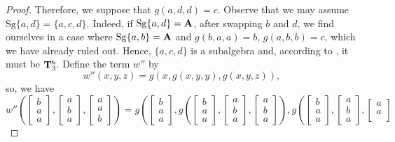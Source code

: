 \documentclass[10pt,a4paper]{amsart}
\newcommand{\m}[1]{\mathbf{\uppercase{#1}}}
\begin{document}
\begin{proof}
Therefore, we suppose that $g(a,d,d)=c$. Observe that we may assume $\mathrm{Sg}\{a,d\}=\{a,c,d\}$. Indeed, if $\mathrm{Sg}\{a,d\}=\m a$, after swapping $b$ and $d$, we find ourselves in a case where $\mathrm{Sg}\{a,b\} = \m a$ and $g(b,a,a) = b$, $g(a,b,b) = c$, which we have already ruled out. Hence, $\{a,c,d\}$ is a subalgebra and, according to , it must be $\m t_3^{\scriptscriptstyle{\mathsf{N}}}$. Define the term $w''$ by $$w''(x,y,z)=g(x,g(x,y,y),g(x,y,z)),$$ so, we have 
 \begin{equation*}
w''\left(
\begin{bmatrix}
b \\
a \\
a
\end{bmatrix}\!,\!
\begin{bmatrix}
a \\
b \\
a
\end{bmatrix}\!,\!
\begin{bmatrix}
a \\
a \\
b
\end{bmatrix}
\right)=
g\left(
\begin{bmatrix}
b \\
a \\
a
\end{bmatrix}\!,\!
g\left(
\begin{bmatrix}
b \\
a \\
a
\end{bmatrix}\!,\!
\begin{bmatrix}
a \\
b \\
a
\end{bmatrix}\!,\!
\begin{bmatrix}
a \\
b \\
a
\end{bmatrix}
\right)\!,\!
g\left(
\begin{bmatrix}
b \\
a \\
a
\end{bmatrix}\!,\!
\begin{bmatrix}
a \\
b \\
a
\end{bmatrix}\!,\!
\begin{bmatrix}
a \\
a \\

\end{bmatrix}
\end{equation*}
\end{proof}
\end{document}
